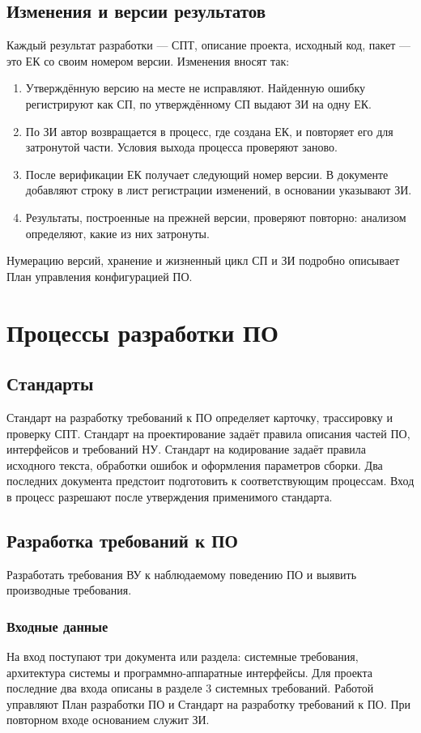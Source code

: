 \documentclass{tpks}
\begin{document}
\subsection{Изменения и версии результатов}
Каждый результат разработки --- СПТ, описание проекта, исходный код, пакет --- это ЕК со своим номером версии. Изменения вносят так:
\begin{enumerate}
\item Утверждённую версию на месте не исправляют. Найденную ошибку регистрируют как СП, по утверждённому СП выдают ЗИ на одну ЕК.
\item По ЗИ автор возвращается в процесс, где создана ЕК, и повторяет его для затронутой части. Условия выхода процесса проверяют заново.
\item После верификации ЕК получает следующий номер версии. В документе добавляют строку в лист регистрации изменений, в основании указывают ЗИ.
\item Результаты, построенные на прежней версии, проверяют повторно: анализом определяют, какие из них затронуты.
\end{enumerate}
Нумерацию версий, хранение и жизненный цикл СП и ЗИ подробно описывает План управления конфигурацией ПО.

\section{Процессы разработки ПО}
\subsection{Стандарты}
Стандарт на разработку требований к ПО определяет карточку, трассировку и проверку СПТ. Стандарт на проектирование задаёт правила описания частей ПО, интерфейсов и требований НУ. Стандарт на кодирование задаёт правила исходного текста, обработки ошибок и оформления параметров сборки. Два последних документа предстоит подготовить к соответствующим процессам. Вход в процесс разрешают после утверждения применимого стандарта.

\subsection{Разработка требований к ПО}
Разработать требования ВУ к наблюдаемому поведению ПО и выявить производные требования.

\subsubsection{Входные данные}
На вход поступают три документа или раздела: системные требования, архитектура системы и программно-аппаратные интерфейсы. Для проекта последние два входа описаны в разделе 3 системных требований. Работой управляют План разработки ПО и Стандарт на разработку требований к ПО. При повторном входе основанием служит ЗИ.
\end{document}
